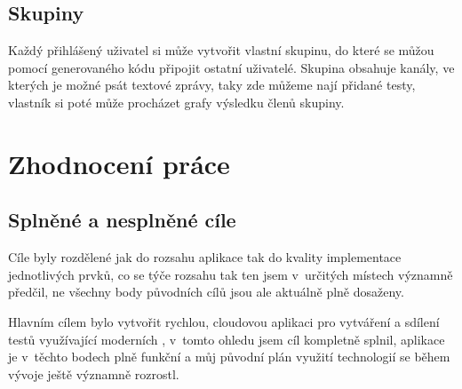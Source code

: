\documentclass[12pt, a4paper,
openright
]{report}
\let\oldchapter\chapter
\renewcommand{\chapter}{
	\clearpage
	\pagestyle{fancy}
	\oldchapter
}
\begin{document}
\section{Skupiny}
Každý přihlášený uživatel si může vytvořit vlastní skupinu, do které se můžou pomocí generovaného kódu připojit ostatní uživatelé. Skupina obsahuje kanály, ve kterých je možné psát textové zprávy, taky zde můžeme nají přidané testy, vlastník si poté může procházet grafy výsledku členů skupiny.


\chapter{Zhodnocení práce}

\section{Splněné a nesplněné cíle}
Cíle byly rozdělené jak do rozsahu aplikace tak do kvality implementace jednotlivých prvků, co se týče rozsahu tak ten jsem v~určitých místech významně předčil, ne všechny body původních cílů jsou ale aktuálně plně dosaženy.

Hlavním cílem bylo vytvořit rychlou, cloudovou aplikaci pro vytváření a sdílení testů využívající moderních , v~tomto ohledu jsem cíl kompletně splnil, aplikace je v~těchto bodech plně funkční a můj původní plán využití technologií se během vývoje ještě významně rozrostl.
\end{document}
